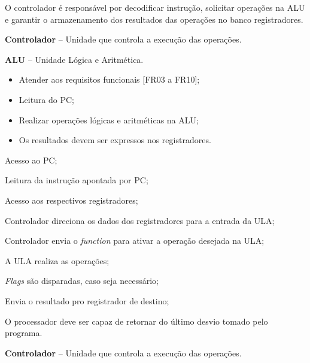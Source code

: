 \documentclass{article}
\begin{document}
  O controlador é responsável por decodificar instrução, solicitar operações na ALU e garantir o armazenamento dos resultados das operações no banco registradores.
  
  \actors
    \begin{description}
     \item \textbf{Controlador} – Unidade que controla a execução das operações.
     \item \textbf{ALU} – Unidade L\'{o}gica e Aritm\'{e}tica.
    \end{description}
    
  \preconditions 
    \begin{itemize}
     \item Atender aos requisitos funcionais [FR03 a FR10];
     \item Leitura do PC;
     \item Realizar operações lógicas e aritméticas na ALU;
    \end{itemize}

  \postconditions
    \begin{itemize}
     \item Os resultados devem ser expressos nos registradores.
    \end{itemize}
  
  
  \begin{mainflow}
    \item Acesso ao PC;
    \item Leitura da instrução apontada por PC;
    \item Acesso aos respectivos registradores;
    \item Controlador direciona os dados dos registradores para a entrada da ULA;
    \item Controlador envia o \textit{function} para ativar a operação desejada na ULA;
    \item A ULA realiza as operações;
    \item \textit{Flags} são disparadas, caso seja necessário;
    \item Envia o resultado pro registrador de destino;
  \end{mainflow}
  
  O processador deve ser capaz de retornar do último desvio tomado pelo programa.
  \actors
  \begin{description}
  	\item \textbf{Controlador} – Unidade que controla a execução das operações.
  \end{description}
  
\end{document}
